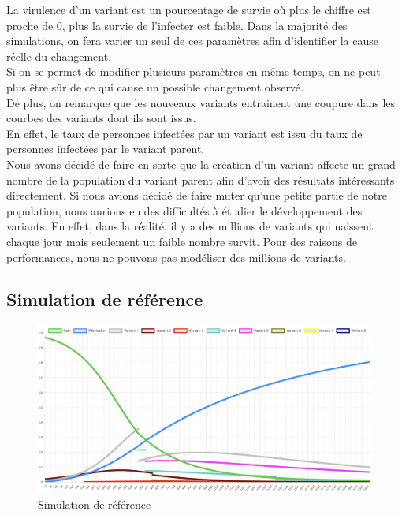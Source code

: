 \documentclass{article}
\begin{document}
\noindent
La virulence d'un variant est un pourcentage de survie où plus le chiffre est proche de 0, plus la survie de l'infecter est faible.
Dans la majorité des simulations, on fera varier un seul de ces paramètres afin d'identifier la cause réelle du changement. \\
Si on se permet de modifier plusieurs paramètres en même temps, on ne peut plus être sûr de ce qui cause un possible changement observé. \\
\noindent
De plus, on remarque que les nouveaux variants entrainent une coupure dans les courbes des variants dont ils sont issus. \\
En effet, le taux de personnes infectées par un variant est issu du taux de personnes infectées par le variant parent. \\
Nous avons décidé de faire en sorte que la création d'un variant affecte un grand nombre de la population du variant parent afin d'avoir des résultats intéressants directement. Si nous avions décidé de faire muter qu'une petite partie de notre population, nous aurions eu des difficultés à étudier le développement des variants. En effet, dans la réalité, il y a des millions de variants qui naissent chaque jour mais seulement un faible nombre survit. Pour des raisons de performances, nous ne pouvons pas modéliser des millions de variants.

\subsection{Simulation de référence}

\begin{figure}[h]
    \includegraphics[width=\linewidth]{images/Simulation1.png}
    \caption{Simulation de référence}
    \label{fig:simulation1}
\end{figure}
\end{document}
